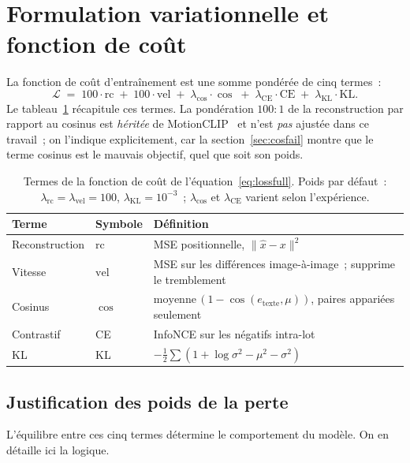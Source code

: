 \documentclass[12pt,a4paper,oneside]{report}
\theoremstyle{definition}
\theoremstyle{plain}
\newcommand{\rc}{\mathrm{rc}}
\newcommand{\vel}{\mathrm{vel}}
\newcommand{\lkl}{\ensuremath{\lambda_{\mathrm{KL}}}}
\newcommand{\lrc}{\ensuremath{\lambda_{\mathrm{rc}}}}
\newcommand{\lvel}{\ensuremath{\lambda_{\mathrm{vel}}}}
\newcommand{\KL}{\mathrm{KL}}
\begin{document}
\section{Formulation variationnelle et fonction de coût}
\label{sec:loss}

La fonction de coût d'entraînement est une somme pondérée de cinq termes~:
\begin{equation}
\mathcal{L} \;=\; 100\cdot\rc \;+\; 100\cdot\vel \;+\;
 \lambda_{\cos}\cdot\cos \;+\;
 \lambda_{\mathrm{CE}}\cdot\mathrm{CE} \;+\;
 \lkl\cdot\KL .
\label{eq:lossfull}
\end{equation}
Le tableau~\ref{tab:loss} récapitule ces termes. La pondération $100{:}1$ de la
reconstruction par rapport au cosinus est \emph{héritée} de
MotionCLIP~\cite{tevet2022motionclip} et n'est \emph{pas} ajustée dans ce travail~;
on l'indique explicitement, car la section~\ref{sec:cosfail} montre que le terme
cosinus est le mauvais objectif, quel que soit son poids.

\begin{table}[ht]
\centering
\caption{Termes de la fonction de coût de l'équation~\eqref{eq:lossfull}. Poids
par défaut~: $\lrc=\lvel=100$, $\lkl=10^{-3}$~; $\lambda_{\cos}$ et
$\lambda_{\mathrm{CE}}$ varient selon l'expérience.}
\label{tab:loss}
\small
\begin{tabular}{@{}llp{7.6cm}@{}}
\toprule
Terme & Symbole & Définition \\
\midrule
Reconstruction & $\rc$  & MSE positionnelle, $\lVert \hat x - x\rVert^2$ \\
Vitesse        & $\vel$ & MSE sur les différences image-à-image~; supprime le tremblement \\
Cosinus        & $\cos$ & $\mathrm{moyenne}\,(1-\cos(e_{\text{texte}},\mu))$, paires appariées seulement \\
Contrastif     & CE   & InfoNCE sur les négatifs intra-lot \\
KL             & KL   & $-\tfrac12\sum(1+\log\sigma^2-\mu^2-\sigma^2)$ \\
\bottomrule
\end{tabular}
\end{table}

\subsection{Justification des poids de la perte}

L'équilibre entre ces cinq termes détermine le comportement du modèle. On en
détaille ici la logique.
\end{document}
